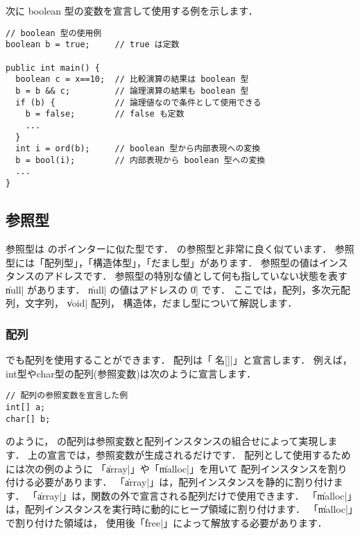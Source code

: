 次に boolean 型の変数を宣言して使用する例を示します．

\begin{mylist}
\begin{verbatim}
// boolean 型の使用例
boolean b = true;     // true は定数

public int main() {
  boolean c = x==10;  // 比較演算の結果は boolean 型
  b = b && c;         // 論理演算の結果も boolean 型
  if (b) {            // 論理値なので条件として使用できる
    b = false;        // false も定数
    ...
  }
  int i = ord(b);     // boolean 型から内部表現への変換
  b = bool(i);        // 内部表現から boolean 型への変換
  ...
}
\end{verbatim}
\end{mylist}

\subsection{参照型}
\label{chap3:ref}

参照型は \cl のポインターに似た型です．
\javal の参照型と非常に良く似ています．
参照型には「配列型」，「構造体型」，「だまし型」があります．
参照型の値はインスタンスのアドレスです．
参照型の特別な値として何も指していない状態を表す \|null| があります．
\|null| の値はアドレスの \|0| です．
ここでは，配列，多次元配列，文字列， \|void| 配列，
構造体，だまし型について解説します．

\subsubsection{配列}
\label{chap3:array}
\cmml でも配列を使用することができます．
配列は「\|型名[]|」と宣言します．
例えば，int型やchar型の配列(参照変数)は次のように宣言します．

\begin{mylist}
\begin{verbatim}
// 配列の参照変数を宣言した例
int[] a;
char[] b;
\end{verbatim}
\end{mylist}


のように，
\cmml の配列は参照変数と配列インスタンスの組合せによって実現します．
上の宣言では，参照変数が生成されるだけです．
配列として使用するためには次の例のように
「\|array|」や「\|malloc|」を用いて
配列インスタンスを割り付ける必要があります．
「\|array|」は，配列インスタンスを静的に割り付けます．
「\|array|」は，関数の外で宣言される配列だけで使用できます．
「\|malloc|」は，配列インスタンスを実行時に動的にヒープ領域に割り付けます．
「\|malloc|」で割り付けた領域は，
使用後「\|free|」によって解放する必要があります．

